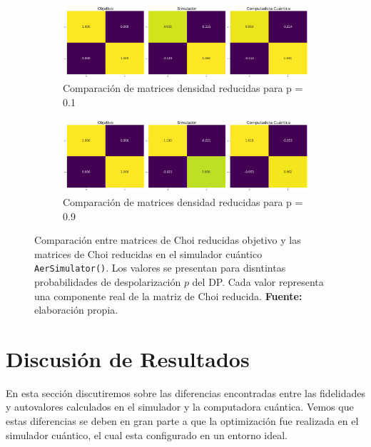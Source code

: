 \documentclass[letterpaper,12pt]{thesisECFM}
\theoremstyle{plain}
\theoremstyle{definition}
\theoremstyle{definition}
\theoremstyle{remark}
\newcommand{\1}{\mathbb{1}}
\begin{document}
\begin{figure}[h!] %
    \centering
    \begin{subfigure}{\textwidth}
        \centering
        \includegraphics[width=0.9\linewidth]{imagenes/ident_comp_0.1.png}
        \caption{Comparación de matrices densidad reducidas para p = 0.1}
        \label{fig:ident_comp_p0.1}
    \end{subfigure}
    \vspace{1em} %
    
   
    \begin{subfigure}{\textwidth}
        \centering
        \includegraphics[width=0.9\linewidth]{imagenes/ident_comp_0.9.png}
        \caption{Comparación de matrices densidad reducidas para p = 0.9}
        \label{fig:ident_comp_p0.9}
    \end{subfigure}
 \caption{Comparación entre matrices de Choi reducidas objetivo  y  las matrices de Choi reducidas en el simulador cuántico \texttt{AerSimulator()}. Los valores se presentan para disntintas probabilidades de despolarización $p$ del DP. Cada valor representa una componente real de la matriz de Choi reducida. \textbf{Fuente:} elaboración propia.}
    \label{fig:ident_comp}
\end{figure}


\section{Discusión de Resultados} %
En esta sección discutiremos sobre las diferencias encontradas entre las
fidelidades y autovalores calculados en el simulador y la computadora cuántica.
Vemos que estas diferencias se deben en gran parte a que la optimización fue
realizada en el simulador cuántico, el cual esta configurado en un entorno
ideal. 
\end{document}
